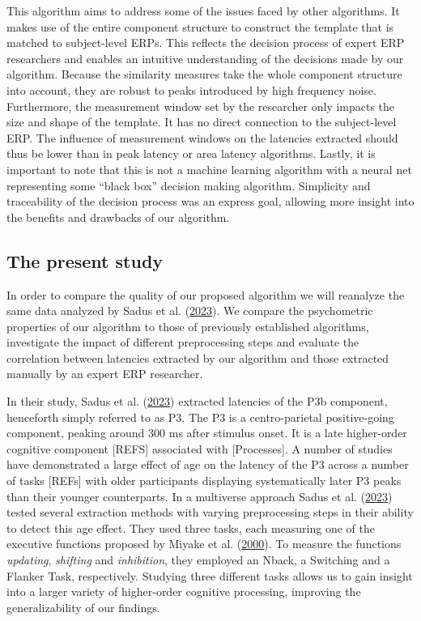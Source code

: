 \documentclass[
  man,floatsintext]{apa7}
\begin{document}
This algorithm aims to address some of the issues faced by other algorithms. It makes use of the entire component structure to construct the template that is matched to subject-level ERPs. This reflects the decision process of expert ERP researchers and enables an intuitive understanding of the decisions made by our algorithm. Because the similarity measures take the whole component structure into account, they are robust to peaks introduced by high frequency noise. Furthermore, the measurement window set by the researcher only impacts the size and shape of the template. It has no direct connection to the subject-level ERP. The influence of measurement windows on the latencies extracted should thus be lower than in peak latency or area latency algorithms. Lastly, it is important to note that this is not a machine learning algorithm with a neural net representing some ``black box'' decision making algorithm. Simplicity and traceability of the decision process was an express goal, allowing more insight into the benefits and drawbacks of our algorithm.

\hypertarget{the-present-study}{%
\subsection{The present study}\label{the-present-study}}

In order to compare the quality of our proposed algorithm we will reanalyze the same data analyzed by Sadus et al. (\protect\hyperlink{ref-sadus2023multiverse}{2023}). We compare the psychometric properties of our algorithm to those of previously established algorithms, investigate the impact of different preprocessing steps and evaluate the correlation between latencies extracted by our algorithm and those extracted manually by an expert ERP researcher.

In their study, Sadus et al. (\protect\hyperlink{ref-sadus2023multiverse}{2023}) extracted latencies of the P3b component, henceforth simply referred to as P3. The P3 is a centro-parietal positive-going component, peaking around 300 ms after stimulus onset. It is a late higher-order cognitive component {[}REFS{]} associated with {[}Processes{]}. A number of studies have demonstrated a large effect of age on the latency of the P3 across a number of tasks {[}REFs{]} with older participants displaying systematically later P3 peaks than their younger counterparts. In a multiverse approach Sadus et al. (\protect\hyperlink{ref-sadus2023multiverse}{2023}) tested several extraction methods with varying preprocessing steps in their ability to detect this age effect. They used three tasks, each measuring one of the executive functions proposed by Miyake et al. (\protect\hyperlink{ref-miyake2000unity}{2000}). To measure the functions \emph{updating}, \emph{shifting} and \emph{inhibition}, they employed an Nback, a Switching and a Flanker Task, respectively. Studying three different tasks allows us to gain insight into a larger variety of higher-order cognitive processing, improving the generalizability of our findings.
\end{document}
